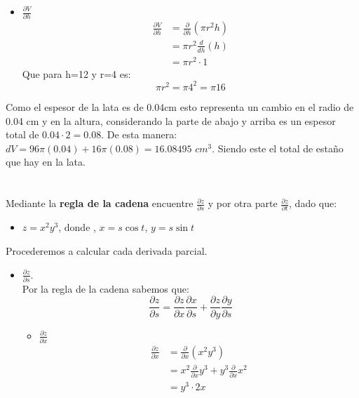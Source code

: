 \documentclass[12pt]{article}
\begin{document}
\begin{itemize}[format=\textbf]
\begin{itemize}
\item $\frac{\partial V}{\partial h}$ \\
  \begin{align*}
    \frac{\partial V}{\partial h}
    &=  \frac{\partial}{\partial h} \left( \pi r^2 h \right) \\
    &=  \pi r^2\frac{d}{d h}(h) \\
    &=  \pi r^2 \cdot 1
  \end{align*}
  Que para h=12 y r=4 es:$$\pi r^2 = \pi 4^2 = \pi 16$$
\end{itemize}

Como el espesor de la lata es de 0.04cm esto representa un cambio en el radio de 0.04 cm y en la altura, considerando la parte de abajo y arriba es un espesor total de $0.04 \cdot 2 = 0.08$. De esta manera:
$dV = 96\pi (0.04) + 16 \pi(0.08) = 16.08495 $ $cm^3$. Siendo este el total de estaño que hay en la lata.


\section{}

Mediante la \textbf{regla de la cadena} encuentre $\frac{\partial z}{\partial s}$ y por otra parte $\frac{\partial z}{\partial t}$, dado que:

\begin{itemize}[format=\textbf]

\item $z=x^2y^3$, donde , $x=s \cos{t}$, $y=s \sin{t}$
\end{itemize}
Procederemos a calcular cada derivada parcial.
\begin{itemize}
\item   $\frac{\partial z}{\partial s}$. \\
  Por la regla de la cadena sabemos que:
  \[
\frac{\partial z}{\partial s} = \frac{\partial z}{\partial x} \frac{\partial x}{\partial s} + \frac{\partial z}{\partial y}\frac{\partial y}{\partial s}
  \]
  \begin{itemize}
  \item  $\frac{\partial z}{\partial x}$
     \begin{align*}
       \frac{\partial z}{\partial x} &= \frac{\partial}{\partial x} \left( x^2 y^3\right) \\
       &=  x^2  \frac{\partial}{\partial x}  y^3 + y^3  \frac{\partial}{\partial x} x^2 \\
       &=  y^3  \cdot 2x
     \end{align*}


\end{itemize}
\end{itemize}
\end{itemize}
\end{document}
